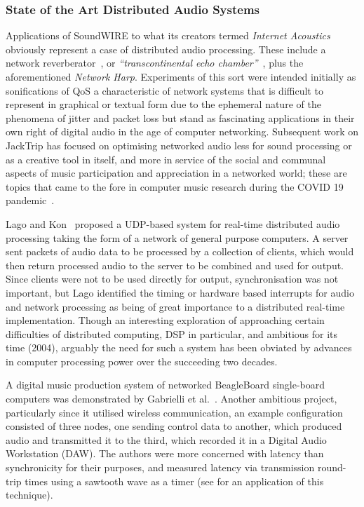 \subsubsection{State of the Art Distributed Audio Systems}

Applications of SoundWIRE to what its creators termed \textit{Internet
Acoustics}~\citep{chafe_physical_2002} obviously represent a case of distributed
audio processing.
These include a network reverberator~\citep{chafe_i_2018}, or
\textit{``transcontinental echo chamber''}~\citep{chafe_simplified_2000},
plus the aforementioned \textit{Network Harp}.
Experiments of this sort were intended initially as sonifications of QoS
\textemdash{} a characteristic of network systems that is difficult to represent
in graphical or textual form due to the ephemeral nature of the phenomena of
jitter and packet loss \textemdash{} but stand as fascinating applications in
their own right of digital audio in the age of computer networking.
Subsequent work on JackTrip has focused on optimising networked audio less
for sound processing or as a creative tool in itself, and more in service of
the social and communal aspects of music participation and appreciation in a
networked world;
these are topics that came to the fore in computer music research during the
COVID 19 pandemic~\citep{bosi_experiencing_2021,sacchetto_jacktrip-webrtc_2021}.

Lago and Kon~\citep{lago_middleware_2003} proposed a UDP-based system for
real-time distributed audio processing taking the form of a network of general
purpose computers.
A server sent packets of audio data to be processed by a collection of
clients, which would then return processed audio to the server to be combined
and used for output.
Since clients were not to be used directly for output, synchronisation was not
important, but Lago identified the timing or hardware based interrupts for
audio and network processing as being of great importance to a distributed
real-time implementation.
Though an interesting exploration of approaching certain difficulties of
distributed computing, DSP in particular, and ambitious for its time (2004),
arguably the need for such a system has been obviated by advances in computer
processing power over the succeeding two decades.

A digital music production system of networked BeagleBoard single-board
computers was demonstrated by Gabrielli et al.~\citep{gabrielli_networked_2012}.
Another ambitious project, particularly since it utilised wireless
communication, an example configuration consisted of three nodes, one sending
control data to another, which produced audio and transmitted it to the third,
which recorded it in a Digital Audio Workstation (DAW).
The authors were more concerned with latency than synchronicity for their
purposes, and measured latency via transmission round-trip times using a
sawtooth wave as a timer (see  for an
application of this technique).

